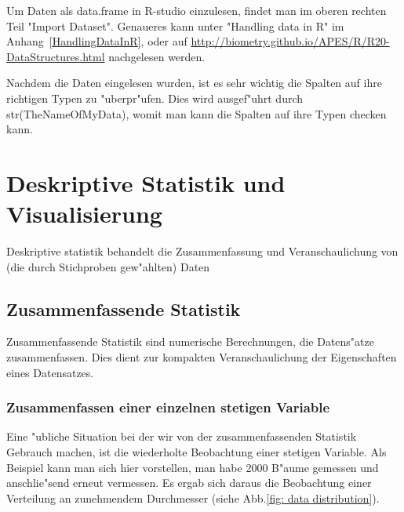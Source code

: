 \documentclass[a4paper,twoside]{tufte-book}\usepackage[]{graphicx}\usepackage[]{color}
\begin{document}
{\begin{fullwidth}
\begin{mdframed}
Um Daten als data.frame in R-studio einzulesen, findet man im oberen rechten Teil "Import Dataset". Genaueres kann unter "Handling data in R" im Anhang~\ref{HandlingDataInR}, oder auf \href{http://biometry.github.io/APES/R/R20-DataStructures.html}{http://biometry.github.io/APES/R/R20-DataStructures.html} nachgelesen werden.

Nachdem die Daten eingelesen wurden, ist es sehr wichtig die Spalten auf ihre richtigen Typen zu "uberpr"ufen. Dies wird ausgef"uhrt durch str(TheNameOfMyData), womit man kann die Spalten auf ihre Typen checken kann.

\end{mdframed}
\end{fullwidth}


\chapter{Deskriptive Statistik und Visualisierung}

Deskriptive statistik behandelt die Zusammenfassung und Veranschaulichung von (die durch Stichproben gew"ahlten) Daten

\section{Zusammenfassende Statistik}

Zusammenfassende Statistik sind numerische Berechnungen, die Datens"atze zusammenfassen. Dies dient zur kompakten Veranschaulichung der Eigenschaften eines Datensatzes.

\subsection{Zusammenfassen einer einzelnen stetigen Variable}

Eine "ubliche Situation bei der wir von der zusammenfassenden Statistik Gebrauch machen, ist die wiederholte Beobachtung einer stetigen Variable. Als Beispiel kann man sich hier vorstellen, man habe 2000 B"aume gemessen und anschlie"send erneut vermessen. Es ergab sich daraus die Beobachtung einer Verteilung an zunehmendem Durchmesser (siehe Abb.\ref{fig: data distribution}).

\begin{figure}[htbp]
\begin{center}
\begin{Schunk}


\end{Schunk}
\end{center}
\end{figure}}
\end{document}
